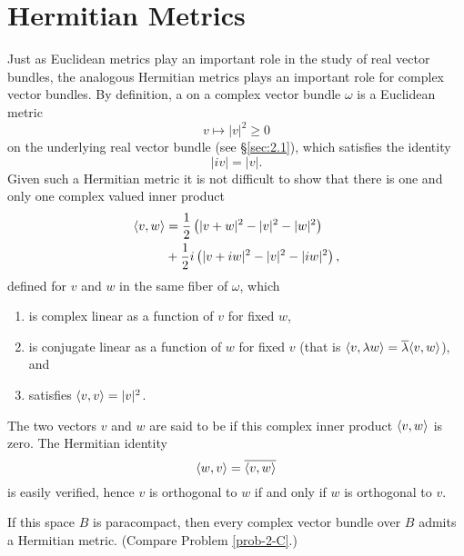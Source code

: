 \documentclass[../main]{subfiles}
\begin{document}
\section{Hermitian Metrics}
Just as Euclidean metrics play an important role in the study of real vector bundles, the analogous Hermitian metrics plays an important role for complex vector bundles. By definition, a  on a complex vector bundle $\omega$ is a Euclidean metric \[v \mapsto |v|^2 \ge 0\] on the underlying real vector bundle (see \S\ref{sec:2.1}), which satisfies the identity \[|i v| = |v|.\] Given such a Hermitian metric it is not difficult to show that there is one and only one complex valued inner product
\begin{align*}
\langle v,w\rangle & = \frac 1 2 \left(|v + w|^2 - |v|^2 - |w|^2\right) \\ & + \frac 1 2 i \left(|v + i w|^2 - |v|^2 - |i w|^2\right),
\end{align*}
defined for $v$ and $w$ in the same fiber of $\omega$, which
\begin{enumerate}[label=(\arabic*)]
    \item is complex linear as a function of $v$ for fixed $w$,
    \item is conjugate linear as a function of $w$ for fixed $v$ (that is $\langle v,\lambda w\rangle = \overline \lambda \langle v,w\rangle$), and
    \item satisfies $\langle v,v\rangle = |v|^2$.
\end{enumerate}

The two vectors $v$ and $w$ are said to be  if this complex inner product $\langle v,w\rangle$ is zero. The Hermitian identity \[\langle w,v\rangle = \overline {\langle v,w\rangle}\] is easily verified, hence $v$ is orthogonal to $w$ if and only if $w$ is orthogonal to $v$. 

If this space $B$ is paracompact, then every complex vector bundle over $B$ admits a Hermitian metric. (Compare Problem \ref{prob-2-C}.)
\end{document}
